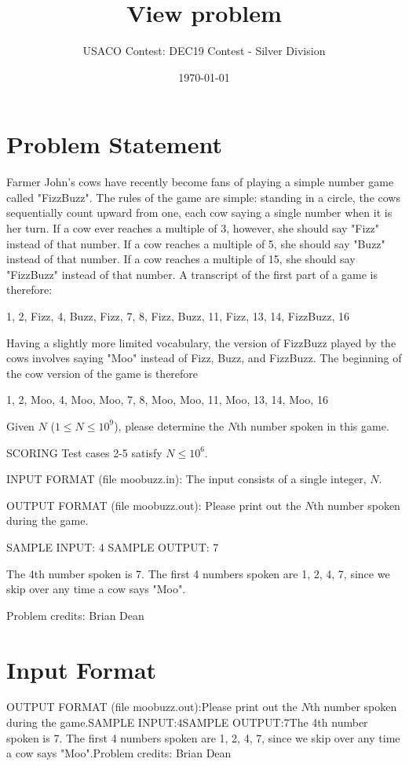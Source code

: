 \documentclass[12pt]{article}
\title{View problem}
\author{USACO Contest: DEC19 Contest - Silver Division}
\date{\today}
\begin{document}
\maketitle

\section*{Problem Statement}

Farmer John's cows have recently become fans of playing a simple number game
called "FizzBuzz".  The rules of the game are simple: standing in a circle, the
cows sequentially count upward from one, each cow saying a single number when it
is her turn.  If a cow ever reaches a multiple of 3, however, she should say
"Fizz" instead of that number.  If a cow reaches a multiple of 5, she should say
"Buzz" instead of that number.  If a cow reaches a multiple of 15, she should
say "FizzBuzz" instead of that number.  A transcript of the first part of a game
is therefore:

1, 2, Fizz, 4, Buzz, Fizz, 7, 8, Fizz, Buzz, 11, Fizz, 13, 14, FizzBuzz, 16

Having a slightly more limited vocabulary, the version of FizzBuzz played by the
cows involves saying "Moo" instead of Fizz, Buzz, and FizzBuzz.  The beginning
of the cow version of the game is therefore

1, 2, Moo, 4, Moo, Moo, 7, 8, Moo, Moo, 11, Moo, 13, 14, Moo, 16

Given $N$ ($1 \leq N \leq 10^9$), please determine the $N$th number spoken in
this game.

SCORING
Test cases 2-5 satisfy $N\le 10^6.$ 

INPUT FORMAT (file moobuzz.in):
The input consists of a single integer, $N$.

OUTPUT FORMAT (file moobuzz.out):
Please print out the $N$th number spoken during the game.

SAMPLE INPUT:
4
SAMPLE OUTPUT: 
7

The 4th number spoken is 7.  The first 4 numbers spoken are 1, 2, 4, 7, since we
skip over any time a cow says "Moo".


Problem credits: Brian Dean



\section*{Input Format}
OUTPUT FORMAT (file moobuzz.out):Please print out the $N$th number spoken during the game.SAMPLE INPUT:4SAMPLE OUTPUT:7The 4th number spoken is 7.  The first 4 numbers spoken are 1, 2, 4, 7, since we
skip over any time a cow says "Moo".Problem credits: Brian Dean
\end{document}
